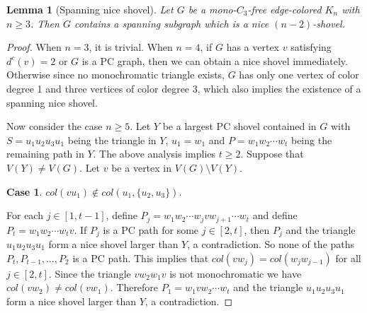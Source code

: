 \documentclass[11pt,a4paper]{article}
\newtheorem{lemma}{Lemma}
\theoremstyle{definition}
\newtheorem{case}{Case}
\begin{document}
\begin{lemma}[Spanning nice shovel]\label{Lem:SPANING}
     Let $G$ be a mono-$C_3$-free edge-colored $K_n$ with $n\geq 3$. Then $G$ contains a spanning subgraph which is a nice $(n-2)$-shovel.
\end{lemma}
\begin{proof}
    When $n=3$, it is trivial.
    When $n=4$, if $G$ has a vertex $v$ satisfying $d^c(v)=2$ or $G$ is a PC graph, then we can obtain a nice shovel immediately. Otherwise since no monochromatic triangle exists, $G$ has only one vertex of color degree 1 and three vertices of color degree 3, which also implies the existence of a spanning nice shovel.

    Now consider the case $n\geq5$. Let $Y$ be a largest PC shovel contained in $G$ with $S=u_1u_2u_3u_1$ being the triangle in $Y$, $u_1=w_1$ and $P=  w_1w_2\cdots w_t$ being the remaining path in $Y$. The above analysis implies $t\geq 2$. Suppose that $V(Y)\neq V(G)$. Let $v$ be a vertex in $V(G)\setminus V(Y)$.

    \begin{case}
         $col(vu_1)\not\in col(u_1,\{u_2,u_3\})$.
    \end{case}
    For each $j\in [1,t-1]$, define $P_j=w_1w_2\cdots w_jvw_{j+1}\cdots w_t$ and define $P_t=w_1w_2\cdots w_tv$. If $P_j$ is a PC path for some $j\in [2,t]$, then $P_j$ and the triangle $u_1u_2u_3u_1$ form a nice shovel larger than $Y$, a contradiction. So none of the paths $P_t,P_{t-1},\ldots, P_2$ is a PC path. This implies that $col(vw_j)=col(w_jw_{j-1})$ for all $j\in [2,t]$. Since the triangle $vw_2w_1v$ is not monochromatic we have $col(vw_2)\neq col(vw_1)$.  Therefore $P_1=w_1vw_2\cdots w_t$ and the triangle $u_1u_2u_3u_1$ form a nice shovel larger than $Y$, a contradiction.


\end{proof}
\end{document}
